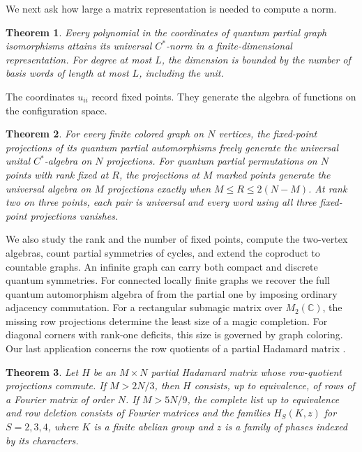 \documentclass[11pt,a4paper]{article}
\newtheorem{introthm}{Theorem}
\begin{document}
We next ask how large a matrix representation is needed to compute a norm.

\begin{introthm}
Every polynomial in the coordinates of quantum partial graph isomorphisms attains its universal $C^*$-norm in a finite-dimensional representation. For degree at most $L$, the dimension is bounded by the number of basis words of length at most $L$, including the unit.
\end{introthm}

The coordinates $u_{ii}$ record fixed points. They generate the algebra of functions on the configuration space.

\begin{introthm}
For every finite colored graph on $N$ vertices, the fixed-point projections of its quantum partial automorphisms freely generate the universal unital $C^*$-algebra on $N$ projections. For quantum partial permutations on $N$ points with rank fixed at $R$, the projections at $M$ marked points generate the universal algebra on $M$ projections exactly when $M\leq R\leq 2(N-M)$. At rank two on three points, each pair is universal and every word using all three fixed-point projections vanishes.
\end{introthm}

We also study the rank and the number of fixed points, compute the two-vertex algebras, count partial symmetries of cycles, and extend the coproduct to countable graphs. An infinite graph can carry both compact and discrete quantum symmetries. For connected locally finite graphs we recover the full quantum automorphism algebra of \cite{rv} from the partial one by imposing ordinary adjacency commutation. For a rectangular submagic matrix over $M_2(\mathbb C)$, the missing row projections determine the least size of a magic completion. For diagonal corners with rank-one deficits, this size is governed by graph coloring. Our last application concerns the row quotients of a partial Hadamard matrix \cite{bs}.

\begin{introthm}
Let $H$ be an $M\times N$ partial Hadamard matrix whose row-quotient projections commute. If $M>2N/3$, then $H$ consists, up to equivalence, of rows of a Fourier matrix of order $N$. If $M>5N/9$, the complete list up to equivalence and row deletion consists of Fourier matrices and the families $H_S(K,z)$ for $S=2,3,4$, where $K$ is a finite abelian group and $z$ is a family of phases indexed by its characters.
\end{introthm}
\end{document}
